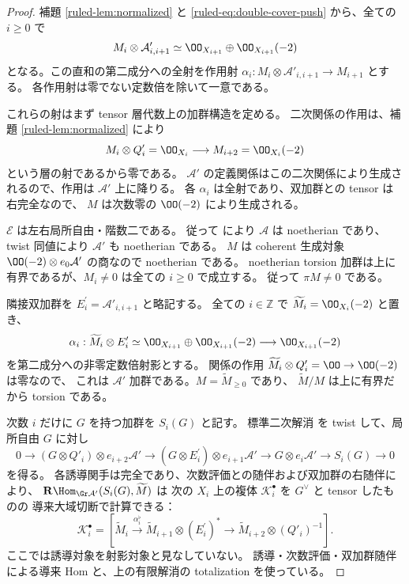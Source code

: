 \begin{proof}
補題 \ref{ruled-lem:normalized} と \eqref{ruled-eq:double-cover-push} から、全ての $i\ge0$ で
\[
 M_i\otimes\mathcal A'_{i,i+1}
 \simeq\OO_{X_{i+1}}\oplus\OO_{X_{i+1}}(-2)
\]
となる。この直和の第二成分への全射を作用射
$\alpha_i:M_i\otimes\mathcal A'_{i,i+1}\to M_{i+1}$ とする。
各作用射は零でない定数倍を除いて一意である。

これらの射はまず tensor 層代数上の加群構造を定める。
二次関係の作用は、補題 \ref{ruled-lem:normalized} により
\[
 M_i\otimes Q'_i=\OO_{X_i}
 \longrightarrow M_{i+2}=\OO_{X_i}(-2)
\]
という層の射であるから零である。
$\mathcal A'$ の定義関係はこの二次関係により生成されるので、作用は
$\mathcal A'$ 上に降りる。
各 $\alpha_i$ は全射であり、双加群との tensor は右完全なので、
$M$ は次数零の $\OO(-2)$ により生成される。

$\mathcal E$ は左右局所自由・階数二である。
従って \cite[Theorem 1.2]{VanDenBergh2012P1} により $\mathcal A$ は noetherian であり、
twist 同値により $\mathcal A'$ も noetherian である。
$M$ は coherent 生成対象 $\OO(-2)\otimes e_0\mathcal A'$ の商なので noetherian である。
noetherian torsion 加群は上に有界であるが、$M_i\ne0$ は全ての $i\ge0$ で成立する。
従って $\pi M\ne0$ である。

隣接双加群を $E_i^\prime=\mathcal A'_{i,i+1}$ と略記する。
全ての $i\in\mathbb Z$ で $\widetilde M_i=\OO_{X_i}(-2)$ と置き、
\[
 \alpha_i:\widetilde M_i\otimes E_i^\prime
 \simeq\OO_{X_{i+1}}\oplus\OO_{X_{i+1}}(-2)
 \longrightarrow\OO_{X_{i+1}}(-2)
\]
を第二成分への非零定数倍射影とする。
関係の作用 $\widetilde M_i\otimes Q'_i=\OO\to\OO(-2)$ は零なので、
これは $\mathcal A'$ 加群である。$M=\widetilde M_{\ge0}$ であり、
$\widetilde M/M$ は上に有界だから torsion である。

次数 $i$ だけに $G$ を持つ加群を $S_i(G)$ と記す。
標準二次解消 \cite[Theorem 7.1.2]{VanDenBergh2012P1} を twist して、局所自由 $G$ に対し
\[
 0\to(G\otimes Q'_i)\otimes e_{i+2}\mathcal A'
 \to(G\otimes E_i^\prime)\otimes e_{i+1}\mathcal A'
 \to G\otimes e_i\mathcal A'\to S_i(G)\to0
\]
を得る。
各誘導関手は完全であり、次数評価との随伴および双加群の右随伴により、
$\mathbf R\Hom_{\Gr\mathcal A'}(S_i(G),\widetilde M)$ は
次の $X_i$ 上の複体 $\mathcal K_i^\bullet$ を $G^\vee$ と tensor したものの
導来大域切断で計算できる：
\[
 \mathcal K_i^\bullet=
 \left[
 \widetilde M_i\xrightarrow{\alpha_i^\flat}
 \widetilde M_{i+1}\otimes(E_i^\prime)^*
 \longrightarrow\widetilde M_{i+2}\otimes(Q'_i)^{-1}
 \right].
\]
ここでは誘導対象を射影対象と見なしていない。
誘導・次数評価・双加群随伴による導来 Hom と、上の有限解消の totalization を使っている。


\end{proof}
